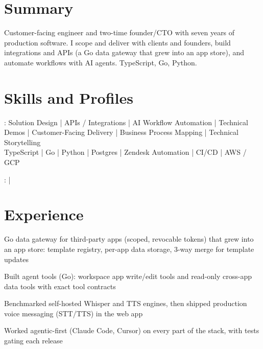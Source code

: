 \documentclass[print]{jack-resume}
\begin{document}
\pagecolor{darkmodeBackground}


\begin{minipage}[t][1cm][t]{.03\textwidth}
    \hfill
\end{minipage}

\section{Summary}
Customer-facing engineer and two-time founder/CTO with seven years of production software. I scope and deliver with clients and founders, build integrations and APIs (a Go data gateway that grew into an app store), and automate workflows with AI agents. TypeScript, Go, Python.
\sectionsep

\section{Skills and Profiles}
:
Solution Design \hfill | \hfill
APIs / Integrations \hfill | \hfill
AI Workflow Automation \hfill | \hfill
Technical Demos \hfill | \hfill
Customer-Facing Delivery \hfill | \hfill
Business Process Mapping \hfill | \hfill
Technical Storytelling \\
\hspace{1.0cm} TypeScript \hfill | \hfill
Go \hfill | \hfill
Python \hfill | \hfill
Postgres \hfill | \hfill
Zendesk Automation \hfill | \hfill
CI/CD \hfill | \hfill
AWS / GCP \\

\raggedright{
    :
      \href{https://www.linkedin.com/in/jack-sturtevant/}{ \ExternalLink} |
     \href{https://github.com/jacksturt}{ \ExternalLink}}

\section{Experience}

\begin{tightemize}
    \item Go data gateway for third-party apps (scoped, revocable tokens) that grew into an app store: template registry, per-app data storage, 3-way merge for template updates
    \item Built agent tools (Go): workspace app write/edit tools and read-only cross-app data tools with exact tool contracts
    \item Benchmarked self-hosted Whisper and TTS engines, then shipped production voice messaging (STT/TTS) in the web app
    \item Worked agentic-first (Claude Code, Cursor) on every part of the stack, with tests gating each release
\end{tightemize}
\sectionsep
\end{document}
